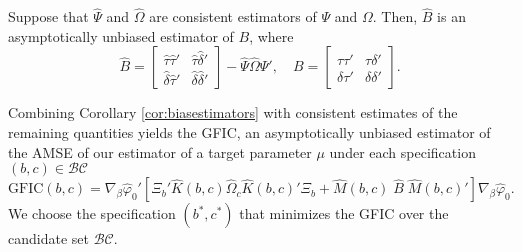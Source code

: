 \begin{cor}
\label{cor:biasestimators}
Suppose that $\widehat{\Psi}$ and $\widehat{\Omega}$ are consistent estimators of $\Psi$ and $\Omega$. Then, $\widehat{B}$ is an asymptotically unbiased estimator of $B$, where
\[
  \widehat{B} = \left[\begin{array}{cc}  \widehat{\tau} \widehat{\tau}'& \widehat{\tau} \widehat{\delta}'\\ \widehat{\delta} \widehat{\tau}'& \widehat{\delta} \widehat{\delta}'\end{array}\right] - \widehat{\Psi} \widehat{\Omega} \widehat{\Psi}', \quad B = 
\left[\begin{array}{cc}  \tau \tau'& \tau \delta'\\ \delta \tau'& \delta \delta'\end{array}\right].
\]
\end{cor}
Combining Corollary \ref{cor:biasestimators} with consistent estimates of the remaining quantities yields the GFIC, an asymptotically unbiased estimator of the AMSE of our estimator of a target parameter $\mu$ under each specification $(b,c)\in \mathcal{BC}$
\begin{equation}
\mbox{GFIC}(b,c) =\nabla_\beta \widehat{\varphi}_0' \left[\Xi_b' \widehat{K}(b,c)\widehat{\Omega}_c \widehat{K}(b,c)'\Xi_b +  \widehat{M}(b,c) \;\widehat{B} \; \widehat{M}(b,c)'\right]\nabla_\beta \widehat{\varphi}_0.
\end{equation}
We choose the specification $(b^*,c^*)$ that minimizes the GFIC over the candidate set $\mathcal{BC}$. 

